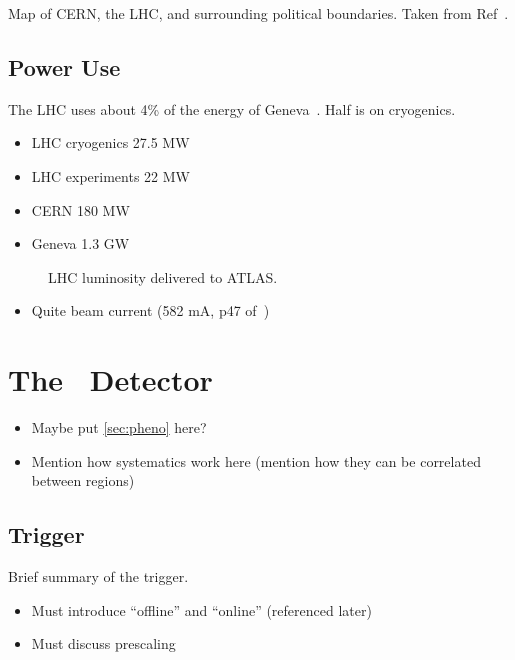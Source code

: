 \begin{cfig}
  \caption[CERN Map]{Map of CERN, the LHC, and surrounding political boundaries. Taken from Ref~\cite{cern-map}.}
  \label{fig:cern-map}
\end{cfig}


\subsection{Power Use}
The LHC uses about 4\% of the energy of Geneva~\cite{lhc-energy}. Half is on cryogenics.
\begin{itemize}
\item LHC cryogenics 27.5 MW
\item LHC experiments 22 MW
\item CERN 180 MW
\item Geneva 1.3 GW
\end{itemize}
\begin{figure}
  \caption[LHC Luminosity Delivered to ATLAS]{%
    LHC luminosity delivered to ATLAS.}
\end{figure}
\begin{itemize}
  \item Quite beam current (582 mA, p47 of~\cite{lhc-machine})
\end{itemize}


\section{The \atlas\ Detector}
\label{sec:atlas}
\begin{itemize}
\item Maybe put \cref{sec:pheno} here?
\item Mention how systematics work here (mention how they can be correlated between regions)
\end{itemize}
\subsection{Trigger}
\label{sec:trigger}
Brief summary of the trigger.
\begin{itemize}
\item Must introduce ``offline'' and ``online'' (referenced later)
\item Must discuss prescaling
\end{itemize}
